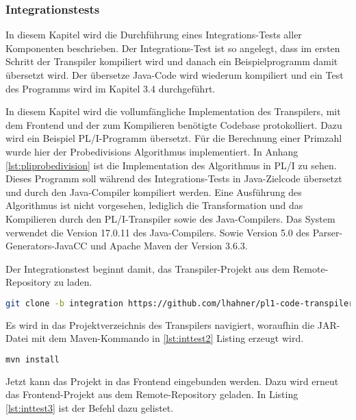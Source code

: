 \subsubsection{Integrationstests}
In diesem Kapitel wird die Durchführung eines Integrations-Tests aller Komponenten beschrieben. Der Integrations-Test ist so angelegt, dass im ersten Schritt der Transpiler kompiliert wird und danach ein Beispielprogramm damit übersetzt wird. Der übersetze Java-Code wird wiederum kompiliert und ein Test des Programms wird im Kapitel 3.4 durchgeführt.

In diesem Kapitel wird die vollumfängliche Implementation des Transpilers, mit dem Frontend und der zum Kompilieren benötigte Codebase protokolliert. Dazu wird ein Beispiel PL/I-Programm übersetzt. Für die Berechnung einer Primzahl wurde hier der Probedivisions Algorithmus implementiert. 
In Anhang \ref{lst:pliprobedivision} ist die Implementation des Algorithmus in PL/I zu sehen. Dieses Programm soll während des Integrations-Tests in Java-Zielcode übersetzt und durch den Java-Compiler kompiliert werden.
Eine Ausführung des Algorithmus ist nicht vorgesehen, lediglich die Transformation und das Kompilieren durch den PL/I-Transpiler sowie des Java-Compilers. Das System verwendet die Version 17.0.11 des Java-Compilers. Sowie Version 5.0 des Parser-Generators-JavaCC und Apache Maven der Version 3.6.3.

Der Integrationstest beginnt damit, das Transpiler-Projekt aus dem Remote-Repository zu laden.

\begin{lstlisting}[language=Bash, caption=Laden des Transpilers, label={lst:inttest1}]
git clone -b integration https://github.com/lhahner/pl1-code-transpiler.git
\end{lstlisting} 

Es wird in das Projektverzeichnis des Transpilers navigiert, woraufhin die JAR-Datei mit dem Maven-Kommando in \ref{lst:inttest2} Listing erzeugt wird.

\begin{lstlisting}[language=Bash, caption=Erzeugen der JAR, label={lst:inttest2}]
mvn install
\end{lstlisting}

Jetzt kann das Projekt in das Frontend eingebunden werden. Dazu wird erneut das Frontend-Projekt aus dem Remote-Repository geladen. In Listing \ref{lst:inttest3} ist der Befehl dazu gelistet.

